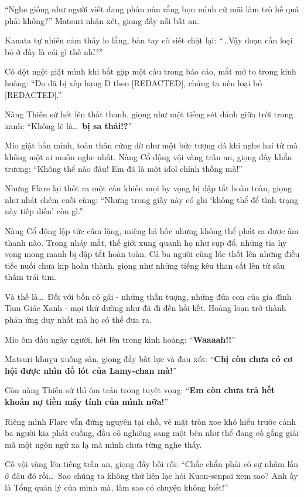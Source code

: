 \documentclass[../main.tex]{subfiles}
\begin{document}
``Nghe giống như người viết đang phàn nàn rằng bọn mình cứ mãi làm trò hề quá phải không?'' Matsuri nhận xét, giọng đầy nỗi bất an.

Kanata tự nhiên cảm thấy lo lắng, bàn tay cô siết chặt lại: ``\dots Vậy đoạn cần loại bỏ ở đây là cái gì thế nhỉ?''

Cô đột ngột giật mình khi bắt gặp một câu trong báo cáo, mắt mở to trong kinh hoàng: ``Do đã bị xếp hạng D theo [REDACTED], chúng ta nên loại bỏ [REDACTED].''

Nàng Thiên sứ hét lên thất thanh, giọng như một tiếng sét đánh giữa trời trong xanh: ``Không lẽ là\dots\ \textbf{bị sa thải!?}''

Mio giật bắn mình, toàn thân cứng đờ như một bức tượng đá khi nghe hai từ mà không một ai muốn nghe nhất. Nàng Cổ động vội vàng trấn an, giọng đầy khẩn trương: ``Không thể nào đâu! Em đã là một idol chính thống mà!''

Nhưng Flare lại thốt ra một câu khiến mọi hy vọng bị dập tắt hoàn toàn, giọng như nhát chém cuối cùng: ``Nhưng trong giấy này có ghi `không thể để tình trạng này tiếp diễn' còn gì.''

Nàng Cổ động lập tức câm lặng, miệng há hốc nhưng không thể phát ra được âm thanh nào. Trong nháy mắt, thế giới xung quanh họ như sụp đổ, những tia hy vọng mong manh bị dập tắt hoàn toàn. Cả ba người cùng lúc thốt lên những điều tiếc nuối chưa kịp hoàn thành, giọng như những tiếng kêu than cất lên từ sâu thẳm trái tim.

Và thế là\dots\ Đối với bốn cô gái - những thần tượng, những đứa con của gia đình Tam Giác Xanh - mọi thứ dường như đã đi đến hồi kết. Hoảng loạn trở thành phản ứng duy nhất mà họ có thể đưa ra.

Mio ôm đầu ngây người, hét lên trong kinh hoàng: ``\textbf{Waaaah!!}''

Matsuri khuỵu xuống sàn, giọng đầy bất lực và đau xót: ``\textbf{Chị còn chưa có cơ hội được nhìn đồ lót của Lamy-chan mà!}''

Còn nàng Thiên sứ thì ôm trán trong tuyệt vọng: ``\textbf{Em còn chưa trả hết khoản nợ tiền máy tính của mình nữa!}''

Riêng mình Flare vẫn đứng nguyên tại chỗ, vẻ mặt tròn xoe khó hiểu trước cảnh ba người kia phát cuồng, đầu cô nghiêng sang một bên như thể đang cố gắng giải mã một ngôn ngữ xa lạ mà mình chưa từng nghe thấy.


Cô vội vàng lên tiếng trấn an, giọng đầy bối rối: ``Chắc chắn phải có sự nhầm lẫn ở đâu đó rồi\dots\ Sao chúng ta không thử liên lạc hỏi Kuon-senpai xem sao? Anh ấy là Tổng quản lý của mình mà, làm sao có chuyện không biết!''
\end{document}
